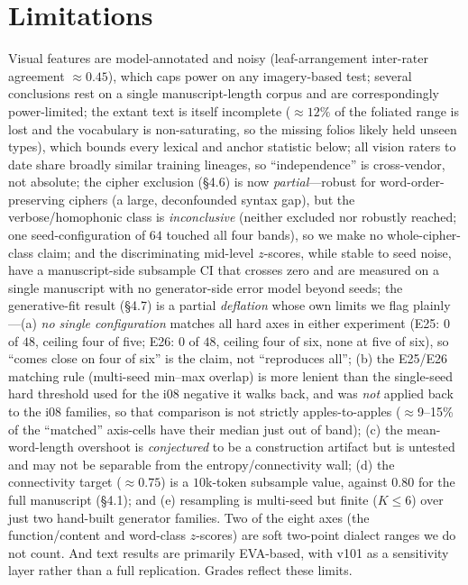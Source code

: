 \documentclass[11pt]{article}
\begin{document}
\section{Limitations}
Visual features are model-annotated and noisy (leaf-arrangement inter-rater agreement
$\approx 0.45$), which caps power on any imagery-based test; several conclusions rest
on a single manuscript-length corpus and are correspondingly power-limited; the extant
text is itself incomplete ($\approx\!12\%$ of the foliated range is lost and the
vocabulary is non-saturating, so the missing folios likely held unseen types), which
bounds every lexical and anchor statistic below; all vision raters to date share
broadly similar training lineages, so ``independence'' is cross-vendor, not absolute;
the cipher exclusion (\S4.6) is now \emph{partial}---robust for word-order-preserving
ciphers (a large, deconfounded syntax gap), but the verbose/homophonic class is
\emph{inconclusive} (neither excluded nor robustly reached; one seed-configuration of $64$
touched all four bands), so we make no whole-cipher-class claim; and the discriminating
mid-level $z$-scores, while stable to seed noise, have a manuscript-side subsample CI that
crosses zero and are measured on a single manuscript with no
generator-side error model beyond seeds; the generative-fit result (\S4.7) is a partial
\emph{deflation} whose own limits we flag plainly---(a) \emph{no single configuration}
matches all hard axes in either experiment (E25: $0$ of $48$, ceiling four of five; E26: $0$
of $48$, ceiling four of six, none at five of six), so ``comes close on four of six'' is the
claim, not ``reproduces all''; (b) the E25/E26 matching rule (multi-seed min--max
overlap) is more lenient than the single-seed hard threshold used for the i08 negative it
walks back, and was \emph{not} applied back to the i08 families, so that comparison is not
strictly apples-to-apples ($\approx$9--15\% of the ``matched'' axis-cells have their median
just out of band); (c) the mean-word-length overshoot is \emph{conjectured} to be a
construction artifact but is untested and may not be separable from the
entropy/connectivity wall; (d) the connectivity target ($\approx 0.75$) is a $10$k-token
subsample value, against $0.80$ for the full manuscript (\S4.1); and (e) resampling is
multi-seed but finite ($K\!\leq\!6$) over just two hand-built generator families. Two of the
eight axes (the function/content and word-class $z$-scores) are soft two-point dialect
ranges we do not count. And text results are primarily EVA-based,
with v101 as a sensitivity layer rather than a full replication. Grades reflect these
limits.
\end{document}
